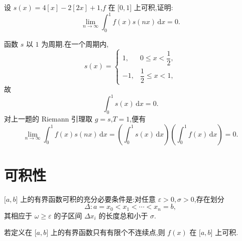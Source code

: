 \begin{example}
    设 $s(x)=4[x]-2[2x]+1$,$f$ 在 $\lbrack 0,1\rbrack$ 上可积,证明:
    \[
        \displaystyle\lim\limits_{n\to\infty}\int_0^1 f(x)s(nx)\,\mathrm{d}x=0.
    \]
\end{example}
\exampleblank

\begin{solution}
    函数 $s$ 以 $1$ 为周期.在一个周期内,
    \[
        s(x)=
        \begin{cases}
            1,  & 0\leq x<\dfrac{1}{2}, \\
            -1, & \dfrac{1}{2}\leq x<1,
        \end{cases}
    \]
    故
    \[
        \displaystyle\int_0^1s(x)\,\mathrm{d}x=0.
    \]
    对上一题的 Riemann 引理取 $g=s$,$T=1$,便有
    \[
        \displaystyle\lim\limits_{n\to\infty}\int_0^1f(x)s(nx)\,\mathrm{d}x
        =\left(\int_0^1s(x)\,\mathrm{d}x\right)
        \left(\int_0^1f(x)\,\mathrm{d}x\right)=0.
    \]
\end{solution}


\newpage

\section{可积性}

\begin{theorem}[\markstar]
    $\lbrack a,b\rbrack$ 上的有界函数可积的充分必要条件是:对任意 $\varepsilon>0,\sigma>0$,存在划分
    \[
        \Delta:a=x_0<x_1<\cdots<x_n=b,
    \]
    其相应于 $\omega\geq\varepsilon$ 的子区间 $\Delta x_i$ 的长度总和小于 $\sigma$.
\end{theorem}

\begin{corollary}[\markstar]
    若定义在 $\lbrack a,b\rbrack$ 上的有界函数只有有限个不连续点,则 $f(x)$ 在 $\lbrack a,b\rbrack$ 上可积.
\end{corollary}

